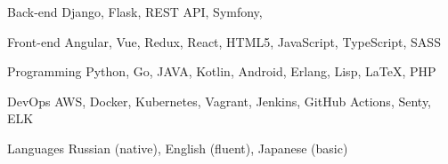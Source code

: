 

\begin{cvskills}

  \cvskill
    {Back-end} %
    {Django, Flask, REST API, Symfony, } %

  \cvskill
    {Front-end} %
    {Angular, Vue, Redux, React, HTML5, JavaScript, TypeScript, SASS} %

  \cvskill
    {Programming} %
    {Python, Go, JAVA, Kotlin, Android, Erlang, Lisp, LaTeX, PHP} %

  \cvskill
    {DevOps} %
    {AWS, Docker, Kubernetes, Vagrant, Jenkins, GitHub Actions, Senty, ELK} %

  \cvskill
    {Languages} %
    {Russian (native), English (fluent), Japanese (basic)} %

\end{cvskills}
